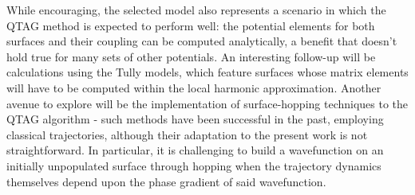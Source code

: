 \documentclass[journal=jpc]{achemso}
\begin{document}
While encouraging, the selected model also represents a scenario in which the QTAG method is expected to perform well: the potential elements for both surfaces and their coupling can be computed analytically, a benefit that doesn't hold true for many sets of other potentials. An interesting follow-up will be calculations using the Tully models, which feature surfaces whose matrix elements will have to be computed within the local harmonic approximation. Another avenue to explore will be the implementation of surface-hopping techniques to the QTAG algorithm - such methods have been successful in the past, employing classical trajectories, although their adaptation to the present work is not straightforward. In particular, it is challenging to build a wavefunction on an initially unpopulated surface through hopping when the trajectory dynamics themselves depend upon the phase gradient of said wavefunction.
\end{document}
